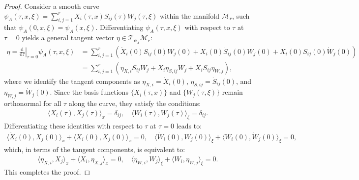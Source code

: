 \documentclass[preprint,11pt]{elsarticle}
\newtheorem{remark}{Remark}[section]
\begin{document}
\begin{proof}
    Consider a smooth curve $\psi_A(\tau,x,\xi)=\sum_{i,j=1}^{r}X_i(\tau,x)S_{ij}(\tau)W_j(\tau,\xi)$ within the manifold $\mathcal{M}_r$, such that $\psi_A(0,x,\xi)=\psi_A(x,\xi)$. Differentiating $\psi_A(\tau,x,\xi)$ with respect to $\tau$ at $\tau=0$ yields a general tangent vector $\eta \in \mathcal{T}_{\psi_A}\mathcal{M}_r$:
    \begin{align*}
        \eta = \left.\frac{\mathrm{d}}{\mathrm{d}\tau}\right|_{\tau=0} \psi_A(\tau,x,\xi)
        &= \sum_{i,j=1}^{r} \left( \dot{X}_i(0) S_{ij}(0) W_j(0) + X_i(0) \dot{S}_{ij}(0) W_j(0) + X_i(0) S_{ij}(0) \dot{W}_j(0) \right) \\
        &= \sum_{i,j=1}^{r} \left( \eta_{X,i} S_{ij} W_j + X_i \eta_{S,ij} W_j + X_i S_{ij} \eta_{W,j} \right),
    \end{align*}
    where we identify the tangent components as $\eta_{X,i} = \dot{X}_i(0)$, $\eta_{S,ij} = \dot{S}_{ij}(0)$, and $\eta_{W,j} = \dot{W}_j(0)$. 
    Since the basis functions $\{X_i(\tau,x)\}$ and $\{W_j(\tau,\xi)\}$ remain orthonormal for all $\tau$ along the curve, they satisfy the conditions:
    \begin{align*}
        \langle X_i(\tau), X_j(\tau) \rangle_{x} = \delta_{ij}, \quad \langle W_i(\tau), W_j(\tau) \rangle_{\xi} = \delta_{ij}.
    \end{align*} 
    Differentiating these identities with respect to $\tau$ at $\tau=0$ leads to:
    \begin{align*}
        \langle \dot{X}_i(0), X_j(0) \rangle_{x} + \langle X_i(0), \dot{X}_j(0) \rangle_{x} = 0, \quad \langle \dot{W}_i(0), W_j(0) \rangle_{\xi} + \langle W_i(0), \dot{W}_j(0) \rangle_{\xi} = 0,
    \end{align*}
    which, in terms of the tangent components, is equivalent to:
    \begin{align*}
        \langle \eta_{X,i}, X_j \rangle_{x} + \langle X_i, \eta_{X,j} \rangle_{x} = 0, \quad 
        \langle \eta_{W,i}, W_j \rangle_{\xi} + \langle W_i, \eta_{W,j} \rangle_{\xi} = 0.
    \end{align*}
    This completes the proof.
\end{proof}

\end{document}
